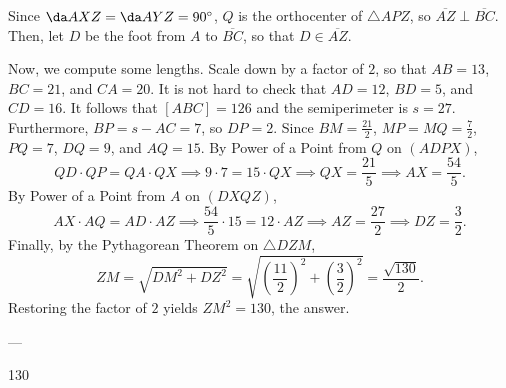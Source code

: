 Since $\da AXZ=\da AYZ=90^\circ$, $Q$ is the orthocenter of $\triangle APZ$, so $\overline{AZ}\perp\overline{BC}$. Then, let $D$ be the foot from $A$ to $\overline{BC}$, so that $D\in\overline{AZ}$.

Now, we compute some lengths. Scale down by a factor of $2$, so that $AB=13$, $BC=21$, and $CA=20$. It is not hard to check that $AD=12$, $BD=5$, and $CD=16$. It follows that $[ABC]=126$ and the semiperimeter is $s=27$. Furthermore, $BP=s-AC=7$, so $DP=2$. Since $BM=\frac{21}2$, $MP=MQ=\frac72$, $PQ=7$, $DQ=9$, and $AQ=15$. By Power of a Point from $Q$ on $(ADPX)$, \[QD\cdot QP=QA\cdot QX\implies 9\cdot 7=15\cdot QX\implies QX=\frac{21}5\implies AX=\frac{54}5.\]
By Power of a Point from $A$ on $(DXQZ)$, \[AX\cdot AQ=AD\cdot AZ\implies \frac{54}5\cdot 15=12\cdot AZ\implies AZ=\frac{27}2\implies DZ=\frac32.\]
Finally, by the Pythagorean Theorem on $\triangle DZM$, \[ZM=\sqrt{DM^2+DZ^2}=\sqrt{\left(\frac{11}2\right)^2+\left(\frac32\right)^2}=\frac{\sqrt{130}}2.\]
Restoring the factor of $2$ yields $ZM^2=130$, the answer.

---

130
